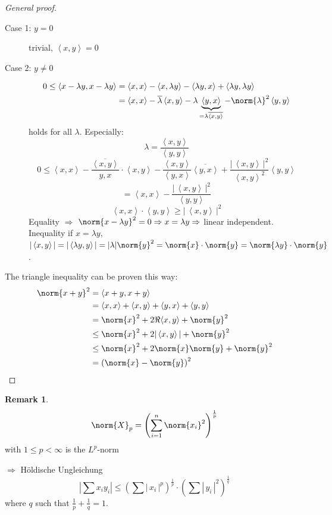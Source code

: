 \documentclass[a4paper,landscape,twocolumn]{article}
\newcommand\abs[1]{|\,#1\,|}
\newcommand\functional[1]{\left\langle{#1}\right\rangle}
\theoremstyle{definition}
\newtheorem{rem}{Remark}
\DeclarePairedDelimiter\norm\lVert\rVert
\begin{document}
\begin{proof}[General proof]
  \begin{description}
    \item[Case 1: $y = 0$] trivial, $\functional{x,y} = 0$
    \item[Case 2: $y \neq 0$]
      \begin{align*}
        0 \leq \functional{x - \lambda y, x - \lambda y}
          &= \functional{x,x} - \functional{x,\lambda y} - \functional{\lambda y, x} + \functional{\lambda y, \lambda y} \\
          &= \functional{x,x} - \overline{\lambda} \functional{x,y} - \lambda \underbrace{\functional{y,x}}_{= \lambda \overline{\functional{x,y}}} - \norm{\lambda}^2 \functional{y,y}
      \end{align*}
      holds for all $\lambda$. Especially:
      \[ \lambda = \frac{\functional{x,y}}{\functional{y,y}} \]
      \[ 0 \leq \functional{x,x} - \frac{\overline{\functional{x,y}}}{y,x} \cdot \functional{x,y} - \frac{\functional{x,y}}{\functional{y,x}} \overline{\functional{y,x}} + \frac{\abs{\functional{x,y}}^2}{\functional{x,y}^2} \functional{y,y} \]
      \[ = \functional{x,x} - \frac{\abs{\functional{x,y}}^2}{\functional{y,y}} \]
      \[ \functional{x,x} \cdot \functional{y,y} \geq \abs{\functional{x,y}}^2 \]
      Equality $\Rightarrow$ $\norm{x - \lambda y}^2 = 0 \Rightarrow x = \lambda y \Rightarrow$ linear independent.
      Inequality if $x = \lambda y$, $|\functional{x,y}| = |\functional{\lambda y,y}| = |\lambda| \norm{y}^2 = \norm{x} \cdot \norm{y} = \norm{\lambda y} \cdot \norm{y}$.
  \end{description}

  The triangle inequality can be proven this way:
  \begin{align*}
    \norm{x + y}^2 &= \functional{x + y, x + y} \\
      &= \functional{x, x} + \functional{x, y} + \functional{y, x} + \functional{y, y} \\
      &= \norm{x}^2 + 2 \Re{\functional{x,y}} + \norm{y}^2 \\
      &\leq \norm{x}^2 + 2 |\functional{x,y}| + \norm{y}^2 \\
      &\leq \norm{x}^2 + 2 \norm{x} \norm{y} + \norm{y}^2 \\
      &= \left(\norm{x} - \norm{y}\right)^2
  \end{align*}
\end{proof}

\begin{rem}
  \[ \norm{X}_p = \left(\sum_{i=1}^n \norm{x_i}^2\right)^{\frac1p} \]
  with $1 \leq p < \infty$ is the $L^p$-norm

  $\Rightarrow$ Höldische Ungleichung
  \[
    |\sum x_i y_i|
      \leq \left(\sum \abs{x_i}^p\right)^{\frac 1p} \cdot \left(\sum \abs{y_i}^2\right)^{\frac 1q}
  \]
  where $q$ such that $\frac 1p + \frac 1q = 1$.
\end{rem}
\end{document}
